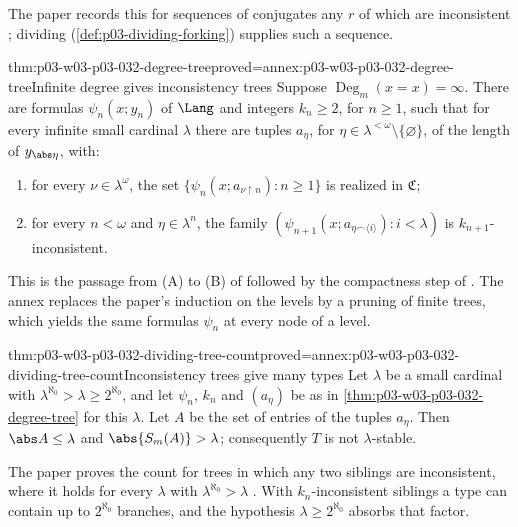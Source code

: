 The paper records this for sequences of conjugates any \(r\) of which are
inconsistent \cite[Remark after Lemma~6.3, p.~349]{Shelah1971Stability};
dividing (\cref{def:p03-dividing-forking}) supplies such a sequence.

\begin{hblemma}{thm:p03-w03-p03-032-degree-tree}{proved=annex:p03-w03-p03-032-degree-tree}{Infinite degree gives inconsistency trees}
Suppose \(\operatorname{Deg}_m(x=x)=\infty\).  There are formulas
\(\psi_n(x;y_n)\) of \(\Lang\) and integers \(k_n\geq2\), for \(n\geq1\),
such that for every infinite small cardinal \(\lambda\) there are tuples
\(a_\eta\), for \(\eta\in\lambda^{<\omega}\setminus\{\varnothing\}\), of the
length of \(y_{\abs\eta}\), with:
\begin{enumerate}
  \item for every \(\nu\in\lambda^\omega\), the set
        \(\{\psi_n(x;a_{\nu\mathbin{\upharpoonright}n}):n\geq1\}\) is
        realized in \(\mathfrak C\);
  \item for every \(n<\omega\) and \(\eta\in\lambda^n\), the family
        \((\psi_{n+1}(x;a_{\eta\frown\langle i\rangle}):i<\lambda)\) is
        \(k_{n+1}\)-inconsistent.
\end{enumerate}
\end{hblemma}

This is the passage from (A) to (B) of
\cite[Theorem~6.4, pp.~349--351]{Shelah1971Stability} followed by the
compactness step of \cite[proof of Theorem~6.5,
pp.~353--354]{Shelah1971Stability}.  The annex replaces the paper's
induction on the levels by a pruning of finite trees, which yields the same
formulas \(\psi_n\) at every node of a level.

\begin{hblemma}{thm:p03-w03-p03-032-dividing-tree-count}{proved=annex:p03-w03-p03-032-dividing-tree-count}{Inconsistency trees give many types}
Let \(\lambda\) be a small cardinal with
\(\lambda^{\aleph_0}>\lambda\geq2^{\aleph_0}\), and let \(\psi_n\),
\(k_n\) and \((a_\eta)\) be as in
\cref{thm:p03-w03-p03-032-degree-tree} for this \(\lambda\).  Let \(A\) be
the set of entries of the tuples \(a_\eta\).  Then \(\abs A\leq\lambda\)
and \(\abs{S_m(A)}>\lambda\); consequently \(T\) is not
\(\lambda\)-stable.
\end{hblemma}

The paper proves the count for trees in which any two siblings are
inconsistent, where it holds for every \(\lambda\) with
\(\lambda^{\aleph_0}>\lambda\) \cite[Theorem~6.5,
pp.~353--354]{Shelah1971Stability}.  With \(k_n\)-inconsistent siblings a
type can contain up to \(2^{\aleph_0}\) branches, and the hypothesis
\(\lambda\geq2^{\aleph_0}\) absorbs that factor.

